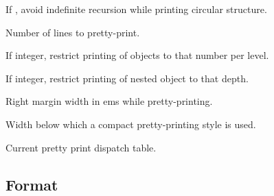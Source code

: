 \begin{LIST}{1cm}
  If \T, avoid indefinite recursion while printing circular
  structure. 

  Number of lines to pretty-print.

  If integer, restrict printing of objects to that number per level.

  If integer, restrict printing of nested object to that depth.

  Right margin width in ems while pretty-printing.

  Width below which a compact pretty-printing style is used.

  Current pretty print dispatch table.

\end{LIST}



\subsection{Format}
\label{section:Format}

